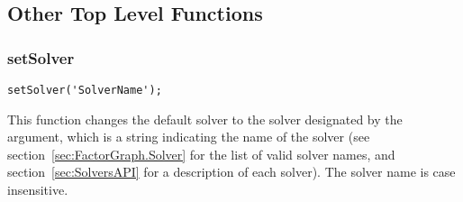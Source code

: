 \subsection{Other Top Level Functions}

\subsubsection{setSolver}

\begin{lstlisting}
setSolver('SolverName');
\end{lstlisting}

This function changes the default solver to the solver designated by the argument, which is a string indicating the name of the solver (see section~\ref{sec:FactorGraph.Solver} for the list of valid solver names, and section~\ref{sec:SolversAPI} for a description of each solver).  The solver name is case insensitive.

%
%
%
%
%
%
%
%
